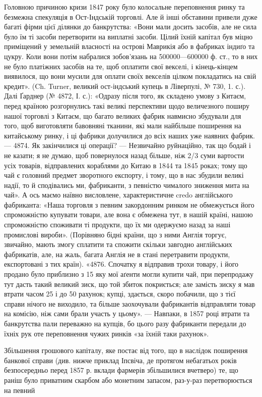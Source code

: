 Головною причиною кризи 1847 року було колосальне переповнення ринку
та безмежна спекуляція в Ост-Індській торговлі. Але й інші обставини привели
дуже багаті фірми цієї ділянки до банкрутства: «Вони мали досить засобів, але не
сила було їм ті засоби перетворити на виплатні засоби. Цілий їхній капітал був міцно
приміщений у земельній власності на острові Маврикія або в фабриках індиґо та
цукру. Коли вони потім набралися зобов’язань на 500000—600000 ф. ст., то
в них не було платіжних засобів на те, щоб оплатити свої векселі, і кінець-кінцем
виявилося, що вони мусили для оплати своїх векселів цілком покладатись
на свій кредит». (Ch. Turner, великий ост-індський купець в Ліверпулі, № 730,
1. с.). Далі Ґарднер (№ 4872, І. с.): «Одразу після того, як складено умову
з Китаєм, перед країною розгорнулись такі великі перспективи щодо величезного
поширу нашої торговлі з Китаєм, що багато великих фабрик навмисно збудували
для того, щоб виготовляти бавовняні тканини, які мали найбільше поширення на китайському
ринку, і ці фабрики долучилися до всіх наших уже наявних фабрик. —
4874. Як закінчилися ці операції? — Незвичайно руйнаційно, так що бодай і не казати;
я не думаю, щоб повернулося назад більше, ніж 2/3 суми вартости усіх товарів,
відправлених кораблями до Китаю в 1844 та 1845 роках; тому що чай є головний
предмет зворотного експорту, і тому, що в нас збудили великі надії, то й сподівались ми,
фабриканти, з певністю чималого зниження мита на чай». А ось маємо наївно висловлене,
характеристичне credo англійського фабриканта: «Наша торговля з певним
закордонним ринком не обмежується його спроможністю купувати товари, але вона
є обмежена тут, в нашій країні, нашою спроможністю споживати ті продукти,
що їх ми одержуємо назад за наші промислові вироби». (Порівняно бідні країни,
що з ними Англія торгує, звичайно, мають змогу сплатити та спожити скільки
завгодно англійських фабрикатів, але, на жаль, багата Англія не в стані перетравити
продукти, експортовані з тих країн). «4876. Спочатку я відправив трохи
товару, і його продано було приблизно з 15%
яку мої аґенти могли купити чай, при перепродажу тут дасть такий великий
зиск, що той збиток покриється; але замість зиску я мав втрати часом 25 і до
50%
рахунок; купці, здається, скоро побачили, що з тієї справи нічого не виходило, та
більше заохочували фабрикантів відправляти товар на комісію, ніж сами брали
участь у цьому». — Навпаки, в 1857 році втрати та банкрутства пали переважно
на купців, бо цього разу фабриканти передали до їхніх рук оте переповнення чужих
ринків «за їхній таки рахунок».

Збільшення грошового капіталу, яке постає від того, що в наслідок поширення
банкової справи (див. нижче приклад Іпсвіча, де протягом небагатьох років
безпосередньо перед 1857 р. вклади фармерів збільшилися вчетверо) те, що раніш було
приватним скарбом або монетним запасом, раз-у-раз перетворюється на певний
